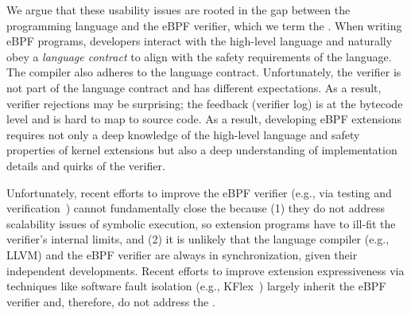 We argue that these usability issues are rooted in the gap
    between the programming language and the eBPF verifier, which we term
    the {\em \gap{}}.
When writing eBPF programs, developers
    interact with the high-level language and naturally obey a
    {\em language contract} to align with the safety requirements of the language.
The compiler also adheres to the language contract.
Unfortunately, the verifier is not part of the language contract and
has different expectations.  As a result, verifier rejections may be
surprising; the feedback (verifier log) is at the bytecode level and is
    hard to map to source code.
As a result,
    developing eBPF extensions requires not only a deep knowledge
    of the high-level language and safety properties of kernel extensions
but also a deep understanding of implementation details and quirks of
    the verifier.

Unfortunately, recent efforts to improve the eBPF verifier (e.g., via testing and verification~\cite{formal-verifier-ebpf,lpc-24-agni})
    cannot fundamentally
    close the \gap{} because
    (1) they do not address scalability issues of symbolic execution, so
        extension programs have to ill-fit the verifier's internal limits,
    and
    (2) it is unlikely that the language compiler (e.g., LLVM) and the eBPF verifier
        are always in synchronization, given their independent developments.
Recent efforts to improve extension expressiveness via techniques
    like software fault isolation (e.g., KFlex~\cite{dwivedi-sosp24})
largely inherit the eBPF verifier and, therefore, do not address the \gap{}.


